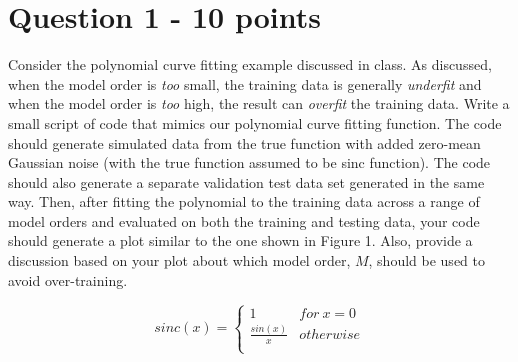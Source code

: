 \documentclass[11pt]{article}
\begin{document}
\section*{Question 1 - 10 points}
Consider the polynomial curve fitting example discussed in class. As discussed, when the model order is \emph{too} small, the training data is generally \emph{underfit} and when the model order is \emph{too} high, the result can \emph{overfit} the training data.  Write a small script of code that mimics our polynomial curve fitting function.  The code should generate simulated data from the true function with added zero-mean Gaussian noise (with the true function assumed to be sinc function). The code should also generate a separate validation test data set generated in the same way.  Then, after fitting the polynomial to the training data across a range of model orders and evaluated on both the training and testing data, your code should generate a plot similar to the one shown in Figure 1.  Also, provide a discussion based on your plot about which model order, $M$, should be used to avoid over-training.

\[  sinc(x) = \left\{
\begin{array}{ll}
      1 & for \: x=0 \\
      \frac{sin(x)}{x} & otherwise\\
\end{array} 
\right. \]
\end{document}

